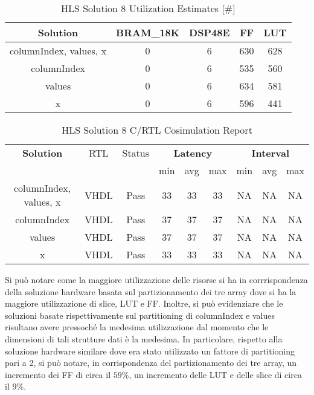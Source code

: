 \begin{table}[H]
	\centering
	\begin{tabular}{|c|c|c|c|c|}
		\hline
		\textbf{Solution} & \textbf{BRAM\_18K} & \textbf{DSP48E} & \textbf{FF} & \textbf{LUT} \\
		\hline
		columnIndex, values, x & 0 & 6 & 630 & 628 \\
		\hline
		columnIndex & 0 & 6 & 535 & 560 \\
		\hline
		values & 0 & 6 & 634 & 581 \\
		\hline
		x & 0 & 6 & 596 & 441 \\
		\hline
	\end{tabular}
	\caption{HLS Solution 8 Utilization Estimates [\#]}
	\label{tab:hls-solution-8-utilization-report}
\end{table}

\begin{table}[H]
	\centering
	\begin{tabular}{|c|c|c|c|c|c|c|c|c|}
		\hline
		\multicolumn{1}{|c|}{\textbf{Solution}} & \multicolumn{1}{|c|}{RTL} & \multicolumn{1}{|c|}{Status} & \multicolumn{3}{c|}{\textbf{Latency}} & \multicolumn{3}{c|}{\textbf{Interval}} \\
		& &  & min & avg & max & min & avg & max \\
		\hline
		columnIndex, values, x & VHDL & Pass & 33 & 33 & 33 & NA & NA & NA \\
		\hline
		columnIndex & VHDL & Pass & 37 & 37 & 37 & NA & NA & NA \\
		\hline
		values & VHDL & Pass & 37 & 37 & 37 & NA & NA & NA \\
		\hline
		x & VHDL & Pass & 33 & 33 & 33 & NA & NA & NA \\
		\hline
	\end{tabular}
	\caption{HLS Solution 8 C/RTL Cosimulation Report }
	\label{tab:hls-solution-8-cosimulation-report}
\end{table}

Si può notare come la maggiore utilizzazione delle risorse si ha in corrrispondenza della soluzione hardware basata sul partizionamento dei tre array dove si ha la maggiore utilizzazione di slice, LUT e FF. Inoltre, si può evidenziare che le soluzioni basate rispettivamente sul partitioning di columnIndex e values risultano avere pressoché la medesima utilizzazione dal momento che le dimensioni di tali strutture dati è la medesima. In particolare, rispetto alla soluzione hardware similare dove era stato utilizzato un fattore di partitioning pari a 2, si può notare, in corrispondenza del partizionamento dei tre array, un incremento dei FF di circa il $59\%$, un incremento delle LUT e delle slice di circa il $9\%$.

